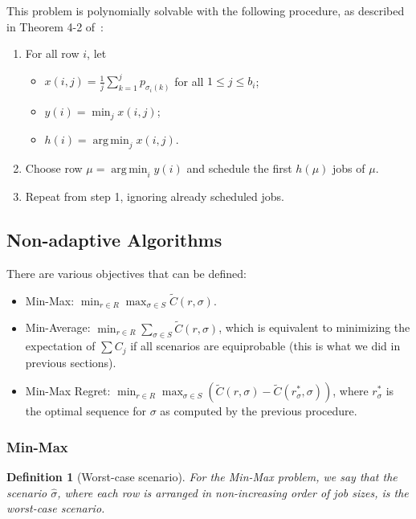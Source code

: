 \documentclass{article}
\newtheorem{definition}{Definition}
\DeclareMathOperator*{\argmin}{arg\,min}
\begin{document}
This problem is polynomially solvable with the following procedure, as described in Theorem 4-2 of~\cite{conway1967theory}:

\begin{enumerate}
    \item For all row \(i\), let
    \begin{itemize}
        \item \(x(i,j)=\frac{1}{j}\sum_{k=1}^j p_{\sigma_i(k)}\) for all \(1\le j\le b_i\);
        \item \(y(i)=\min_j x(i,j)\);
        \item \(h(i)=\argmin_j x(i,j)\).
    \end{itemize}
    \item Choose row \(\mu=\argmin_i y(i)\) and schedule the first \(h(\mu)\) jobs of \(\mu\).
    \item Repeat from step 1, ignoring already scheduled jobs.
\end{enumerate}

\subsection{Non-adaptive Algorithms}

There are various objectives that can be defined:
\begin{itemize}
    \item Min-Max: \(\min_{r\in R} \max_{\sigma\in S} \tilde{C}(r,\sigma)\).
    \item Min-Average: \(\min_{r\in R} \sum_{\sigma\in S} \tilde{C}(r,\sigma)\), which is equivalent to minimizing the expectation of \(\sum C_j\) if all scenarios are equiprobable (this is what we did in previous sections).
    \item Min-Max Regret: \(\min_{r\in R}\max_{\sigma\in S} \left(\tilde{C}(r,\sigma)-\tilde{C}(r^*_{\sigma},\sigma)\right)\), where \(r^*_{\sigma}\) is the optimal sequence for \(\sigma\) as computed by the previous procedure.
\end{itemize}

\subsubsection{Min-Max}


\begin{definition}[Worst-case scenario]
    For the Min-Max problem, we say that the scenario \(\hat{\sigma}\), where each row is arranged in non-increasing order of job sizes, is the worst-case scenario.
\end{definition}
\end{document}
